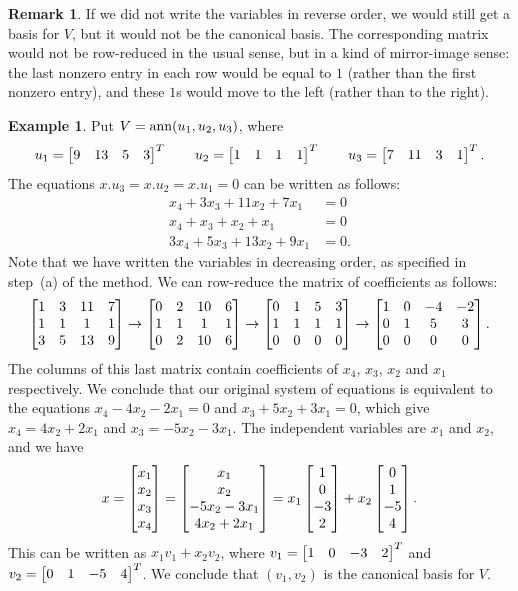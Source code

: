 \documentclass[reqno]{amsart}
\theoremstyle{definition}
\newtheorem{remark}[theorem]{Remark}
\newtheorem{example}[theorem]{Example}
\begin{document}
\begin{remark}\label{rem-mirror}
 If we did not write the variables in reverse order, we would still
 get a basis for $V$, but it would not be the canonical basis.  The
 corresponding matrix would not be row-reduced in the usual sense, but
 in a kind of mirror-image sense: the last nonzero entry in each row
 would be equal to $1$ (rather than the first nonzero entry), and
 these $1$s would move to the left (rather than to the right).
\end{remark}

\begin{example}\label{eg-ann-basis-i}
 Put $V=\operatorname{ann}(u_1,u_2,u_3)$, where
 \[  u_1 = \left[\begin{matrix} 9& 13&5&3\end{matrix}\right]^T \qquad
     u_2 = \left[\begin{matrix} 1&1&1&1\end{matrix}\right]^T \qquad
     u_3 = \left[\begin{matrix} 7&11&3&1\end{matrix}\right]^T.
 \]
 The equations $x.u_3=x.u_2=x.u_1=0$ can be written as follows:
 \begin{align*}
  x_4 + 3x_3 + 11x_2 + 7x_1 &= 0 \\
  x_4 + x_3 + x_2 + x_1 &= 0 \\
  3x_4+5x_3+13x_2+9x_1 &= 0.
 \end{align*}
 Note that we have written the variables in decreasing order, as
 specified in step~(a) of the method.  We can row-reduce the matrix of
 coefficients as follows:
 \[ \left[\begin{matrix} 1&3&11&7 \\ 1&1&1&1 \\ 3&5&13&9 \end{matrix}\right]
    \to
    \left[\begin{matrix} 0&2&10&6 \\ 1&1&1&1 \\ 0&2&10&6 \end{matrix}\right]
    \to
    \left[\begin{matrix} 0&1&5&3 \\ 1&1&1&1 \\ 0&0&0&0 \end{matrix}\right]
    \to
    \left[\begin{matrix} 1&0&-4&-2 \\ 0&1&5&3 \\ 0&0&0&0 \end{matrix}\right].
 \]
 The columns of this last matrix contain coefficients of $x_4$,
 $x_3$, $x_2$ and $x_1$ respectively.  We conclude that our original
 system of equations is equivalent to the equations $x_4-4x_2-2x_1=0$ and
 $x_3+5x_2+3x_1=0$, which give $x_4=4x_2+2x_1$ and
 $x_3=-5x_2-3x_1$.  The independent variables are $x_1$ and $x_2$, and
 we have
 \[ x = \left[\begin{matrix} x_1\\x_2\\x_3\\x_4 \end{matrix}\right]
      = \left[\begin{matrix} x_1\\x_2\\-5x_2-3x_1\\ 4x_2+2x_1\end{matrix}\right]
      = x_1\left[\begin{matrix} 1\\0\\-3\\2\end{matrix}\right] +
        x_2\left[\begin{matrix} 0\\1\\-5\\4\end{matrix}\right].
 \]
 This can be written as $x_1v_1+x_2v_2$, where $v_1=\left[\begin{matrix} 1&0&-3&2\end{matrix}\right]^T$
 and $v_2=\left[\begin{matrix} 0&1&-5&4\end{matrix}\right]^T$.  We conclude that $(v_1,v_2)$ is the
 canonical basis for $V$.
\end{example}
\end{document}
